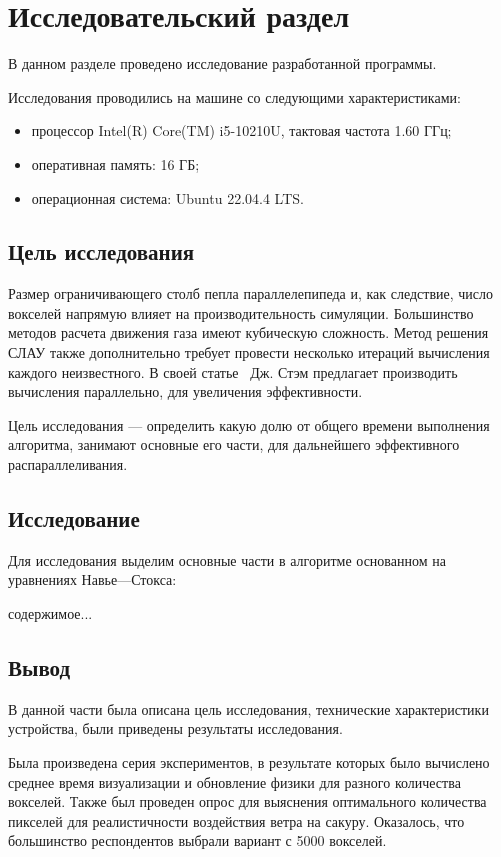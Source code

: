 \chapter{Исследовательский раздел}
В данном разделе проведено исследование разработанной программы.

Исследования проводились на машине со следующими характеристиками:
\begin{itemize}[label=---]
	\item процессор Intel(R) Core(TM) i5-10210U, тактовая частота 1.60 ГГц;
	\item оперативная память: 16 ГБ;
	\item операционная система: Ubuntu 22.04.4 LTS.
\end{itemize}

\section{Цель исследования}

Размер ограничивающего столб пепла параллелепипеда и, как следствие, число вокселей напрямую влияет на производительность симуляции. Большинство методов расчета движения газа имеют кубическую сложность. Метод решения СЛАУ также дополнительно требует провести несколько итераций вычисления каждого неизвестного. В своей статье~\cite{stam} Дж. Стэм предлагает производить вычисления параллельно, для увеличения эффективности.

Цель исследования --- определить какую долю от общего времени выполнения алгоритма, занимают основные его части, для дальнейшего эффективного распараллеливания.

\section{Исследование}

Для исследования выделим основные части в алгоритме основанном на уравнениях Навье---Стокса:
\begin{itemize}
	содержимое...
\end{itemize}

\section*{Вывод}
В данной части была описана цель исследования, технические характеристики устройства, были приведены результаты исследования.

Была произведена серия экспериментов, в результате которых было вычислено среднее время визуализации и обновление физики для разного количества вокселей. Также был проведен опрос для выяснения оптимального количества пикселей для реалистичности воздействия ветра на сакуру. Оказалось, что большинство респондентов выбрали вариант с 5000 вокселей.
